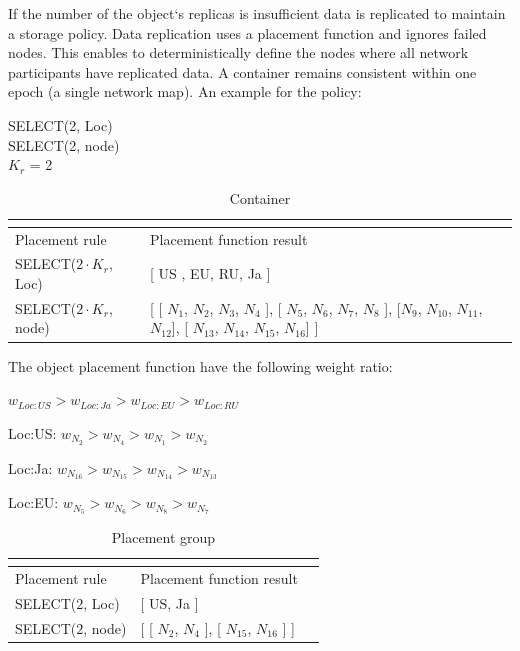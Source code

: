 \documentclass[a4paper, 11pt]{article}
\begin{document}
If the number of the object`s replicas is insufficient data is replicated to
maintain a storage policy. Data replication uses a placement function and
ignores failed nodes. This enables to deterministically define the nodes where
all network participants have replicated data. A container remains
consistent within one epoch (a single network map). An example for the policy:

\begin{scriptsize}
\indent SELECT(2, Loc) \\
\indent SELECT(2, node) \\
\indent $K_r$ = 2
\end{scriptsize}

\FloatBarrier

\begin{table}[!htbp]
\begin{scriptsize}
\begin{tabular}{@{}|l|l|l|@{}}
\multicolumn{2}{l}{}                           \\ \midrule
Placement rule & Placement function result            \\ \midrule
SELECT($2 \cdot K_r$, Loc) & [ US , EU, RU, Ja ] \\ \midrule
SELECT($2 \cdot K_r$, node) & \parbox{6cm}{ [ [ $N_1$, $N_2$, $N_3$, $N_4$ ], [ $N_5$, $N_6$, $N_7$, $N_8$ ], [$N_9$, $N_{10}$, $N_{11}$, $N_{12}$], [ $N_{13}$, $N_{14}$, $N_{15}$, $N_{16}$] ] } \\ \bottomrule
\end{tabular}
\end{scriptsize}
\caption{Container}
\end{table}
\FloatBarrier
 The object placement function have the following weight ratio:
\begin{scriptsize}

$w_{Loc:US} > w_{Loc:Ja} > w_{Loc:EU} > w_{Loc:RU}$

Loc:US: $w_{N_2} > w_{N_4} > w_{N_1} > w_{N_2}$

Loc:Ja: $w_{N_{16}} > w_{N_{15}} > w_{N_{14}} > w_{N_{13}}$

Loc:EU: $w_{N_{5}} > w_{N_{6}} > w_{N_{8}} > w_{N_{7}}$

\end{scriptsize}

\FloatBarrier

\begin{table}[!htbp]
\begin{scriptsize}
\begin{tabular}{@{}|l|l|l|@{}}
\multicolumn{2}{l}{}                           \\ \midrule
Placement rule & Placement function result            \\ \midrule
SELECT($2$, Loc) &  [ US, Ja ] \\ \midrule
SELECT($2$, node) & \parbox{6cm}{ [ [ $N_2$, $N_4$ ], [ $N_{15}$, $N_{16}$ ] ] } \\ \bottomrule
\end{tabular}
\end{scriptsize}
\caption{Placement group}
\end{table}
\end{document}
